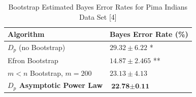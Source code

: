 \documentclass{article}
\begin{document}
	\begin{table}[!h]		
		\caption{Bootstrap Estimated Bayes Error Rates for Pima Indians Data Set [4]}
		\begin{center}
			\begin{tabular}[!h]{ |p{5cm}||p{4cm}|  }
				\hline
				Algorithm & Bayes Error Rate (\%) \\ [0.5ex] 
				\hline\hline
						$D_p$ (no Bootstrap) & $29.32 \pm 6.22$ * \\
						Efron Bootstrap  & $14.87 \pm 2.465$ ** 	\\
						$m < n$ Bootstrap, $m=200$ & $23.13 \pm 4.13$ 	\\
				\textbf{$D_p$ Asymptotic Power Law} & $\textbf{22.78} \pm \textbf{0.11}$\\ 
				\hline 		
			\end{tabular}
		\end{center}
	\end{table}
\end{document}

